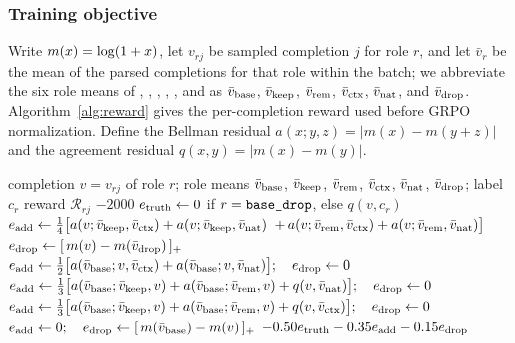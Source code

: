 \subsubsection{Training objective}

Write $m(x)=\log(1+x)$, let $v_{rj}$ be sampled completion $j$ for role $r$,
and let $\bar v_r$ be the mean of the parsed completions for that role within
the batch; we abbreviate the six role means of ,
, , ,
, and  as $\bar v_{\rm base}$,
$\bar v_{\rm keep}$, $\bar v_{\rm rem}$, $\bar v_{\rm ctx}$,
$\bar v_{\rm nat}$, and $\bar v_{\rm drop}$. Algorithm~\ref{alg:reward} gives
the per-completion reward used before GRPO normalization. Define the
Bellman residual $a(x;y,z)=|m(x)-m(y+z)|$ and the agreement residual
$q(x,y)=|m(x)-m(y)|$.

\begin{algorithm}[t]
\caption{\textsc{TrainingReward} --- exact per-completion reward.}
\label{alg:reward}
\begin{algorithmic}[1]
\Require completion $v=v_{rj}$ of role $r$; role means $\bar v_{\rm base}$,
  $\bar v_{\rm keep}$, $\bar v_{\rm rem}$, $\bar v_{\rm ctx}$,
  $\bar v_{\rm nat}$, $\bar v_{\rm drop}$; label $c_r$
\Ensure reward $\mathcal{R}_{rj}$
  \State \Return $-2000$
\EndIf
\State $e_{\rm truth}\gets 0$ if $r=\text{\texttt{base\_drop}}$, else $q(v,c_r)$
  \State $e_{\rm add}\gets\tfrac14\bigl[
    a(v;\bar v_{\rm keep},\bar v_{\rm ctx})+a(v;\bar v_{\rm keep},\bar v_{\rm nat})$
  \Statex \hspace{5.9em}$
    +\,a(v;\bar v_{\rm rem},\bar v_{\rm ctx})+a(v;\bar v_{\rm rem},\bar v_{\rm nat})\bigr]$
  \State $e_{\rm drop}\gets[\,m(v)-m(\bar v_{\rm drop})\,]_+$
  \State $e_{\rm add}\gets\tfrac12\bigl[
    a(\bar v_{\rm base};v,\bar v_{\rm ctx})+a(\bar v_{\rm base};v,\bar v_{\rm nat})
    \bigr];\quad e_{\rm drop}\gets0$
  \State $e_{\rm add}\gets\tfrac13\bigl[
    a(\bar v_{\rm base};\bar v_{\rm keep},v)+a(\bar v_{\rm base};\bar v_{\rm rem},v)
    +q(v,\bar v_{\rm nat})\bigr];\quad e_{\rm drop}\gets0$
  \State $e_{\rm add}\gets\tfrac13\bigl[
    a(\bar v_{\rm base};\bar v_{\rm keep},v)+a(\bar v_{\rm base};\bar v_{\rm rem},v)
    +q(v,\bar v_{\rm ctx})\bigr];\quad e_{\rm drop}\gets0$
\Else {}
  \State $e_{\rm add}\gets0;\quad
    e_{\rm drop}\gets[\,m(\bar v_{\rm base})-m(v)\,]_+$
\EndIf
\State \Return $-0.50e_{\rm truth}-0.35e_{\rm add}-0.15e_{\rm drop}$
\end{algorithmic}
\end{algorithm}

